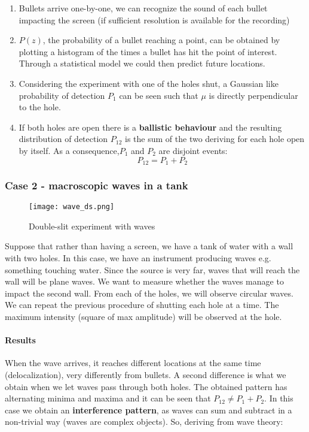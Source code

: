     \begin{multicols}{2}
      \begin{enumerate}
          \item Bullets arrive one-by-one, we can recognize the sound of each bullet impacting the screen (if sufficient resolution is available for the recording)
          \item $P(z)$, the probability of a bullet reaching a point, can be obtained by plotting a histogram of the times a bullet has hit the point of interest. Through a statistical model we could then predict future locations.
          \item Considering the experiment with one of the holes shut, a Gaussian like probability of detection $P_1$ can be seen such that $\mu$ is directly perpendicular to the hole.
          \item If both holes are open there is a \textbf{ballistic behaviour} and the resulting distribution of detection $P_{12}$ is the sum of the two deriving for each hole open by itself. As a consequence,$P_1$ and $P_2$ are disjoint events: $$P_{12} = P_1+P_2$$
      \end{enumerate}
    \end{multicols}

   \subsubsection{Case 2 - macroscopic waves in a tank}

   \begin{figure}[h!]
     \centering
     \texttt{[image: wave\_ds.png]}
     \caption{\label{fig:wave_ds} Double-slit experiment with waves}
   \end{figure}

     Suppose that rather than having a screen, we have a tank of water with a wall with two holes.
     In this case, we have an instrument producing waves e.g. something touching water.
     Since the source is very far, waves that will reach the wall will be plane waves.
     We want to measure whether the waves manage to impact the second wall.
     From each of the holes, we will observe circular waves.
     We can repeat the previous procedure of shutting each hole at a time.
     The maximum intensity (square of max amplitude) will be observed at the hole.

        \paragraph{Results}
        When the wave arrives, it reaches different locations at the same time (delocalization), very differently from bullets.
        A second difference is what we obtain when we let waves pass through both holes.
        The obtained pattern has alternating minima and maxima and it can be seen that $P_{12} \neq P_1+P_2$.
        In this case we obtain an \textbf{interference pattern}, as waves can sum and subtract in a non-trivial way (waves are complex objects).
        So, deriving from wave theory:

